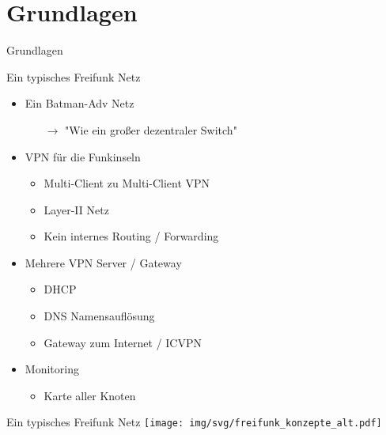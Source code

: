 \section{Grundlagen}
\begin{frame}{}
    \begin{center}
        Grundlagen
     \end{center}
\end{frame}


\begin{frame}{Ein typisches Freifunk Netz}
    \begin{itemize}
        \item Ein Batman-Adv Netz
        \begin{itemize}
            \item[$\rightarrow$] "Wie ein großer dezentraler Switch"
        \end{itemize}
        \item VPN für die Funkinseln
        \begin{itemize}
            \item Multi-Client zu Multi-Client VPN
            \item Layer-II Netz
            \item Kein internes Routing / Forwarding
        \end{itemize}
        \item Mehrere VPN Server / Gateway
        \begin{itemize}
            \item DHCP
            \item DNS Namensauflösung
            \item Gateway zum Internet / ICVPN
        \end{itemize}
        \item Monitoring
        \begin{itemize}
            \item Karte aller Knoten
        \end{itemize}
    \end{itemize}
\end{frame}

\begin{frame}{Ein typisches Freifunk Netz}
    \texttt{[image: img/svg/freifunk\_konzepte\_alt.pdf]}
\end{frame}

